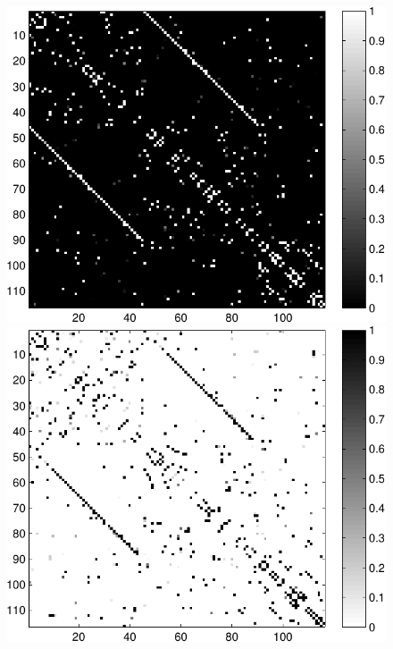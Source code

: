 \documentclass[a4paper, 10pt, english, onecolumn]{article}
\begin{document}
\begin{figure}[h!]
  \centering
  \includegraphics[height=0.29\textheight]{images/new/struct_subj1-crop}
  \includegraphics[height=0.29\textheight]{images/new/struct_subj2_colorbar-crop} %

\end{figure}
\end{document}
